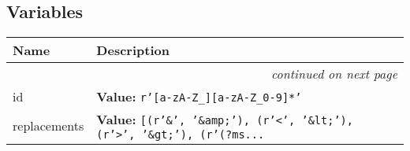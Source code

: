 
  \subsection{Variables}

    \vspace{-1cm}
\hspace{\varindent}\begin{longtable}{|p{\varnamewidth}|p{\vardescrwidth}|l}
\cline{1-2}
\cline{1-2} \centering \textbf{Name} & \centering \textbf{Description}& \\
\cline{1-2}
\endhead\cline{1-2}\multicolumn{3}{r}{\small\textit{continued on next page}}\\\endfoot\cline{1-2}
\endlastfoot\raggedright i\-d\- & \raggedright \textbf{Value:} 
{\tt r'[a-zA-Z\_][a-zA-Z\_0-9]*'}&\\
\cline{1-2}
\raggedright r\-e\-p\-l\-a\-c\-e\-m\-e\-n\-t\-s\- & \raggedright \textbf{Value:} 
{\tt [(r'\&', '\&amp;'), (r'{\textless}', '\&lt;'), (r'{\textgreater}', '\&gt;'), (r'(?ms\texttt{...}}&\\
\cline{1-2}
\end{longtable}

